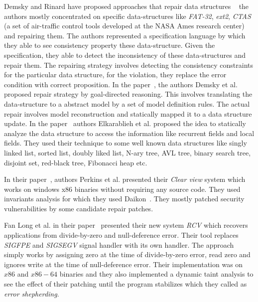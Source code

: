 {
Demsky and Rinard have proposed approaches that repair data structures ~\cite{
Demsky03automaticdata, conf/issre/DemskyR03,conf/oopsla/DemskyR03,
conf/issta/DemskyEGMPR06} the authors mostly concentrated on specific
data-structures like \emph{FAT-32}, \emph{ext2}, \emph{CTAS} (a set of
air-traffic control tools developed at the NASA Ames research center) and
repairing them. The authors represented a specification language by which they
able to see consistency property these data-structure.
Given the specification, they able to detect the inconsistency of these
data-structures and repair them.
The repairing strategy involves detecting the consistency constraints for the
particular data structure, for the violation, they replace the error condition
with correct proposition. In the paper~\cite{conf/icse/DemskyR05}, the authors
Demsky et al. proposed repair strategy by goal-directed reasoning. This involves
translating the data-structure to a abstract model by a set of model definition
rules. The actual repair involves model reconstruction and statically mapped it
to a data structure update. In the paper~\cite{conf/oopsla/2007} authors
Elkarablieh et al. proposed the idea to statically analyze the data structure to
access the information like recurrent fields and local fields. They used their
technique to some well known data structures like singly linked list, sorted
list, doubly liked list, N-ary tree, AVL tree, binary search tree, disjoint set,
red-black tree, Fibonacci heap etc.

In their paper~\cite{conf/sosp/PerkinsKLABCPSSSWZER09}, authors Perkins et al.
presented their \emph{Clear view} system which works on windows x86 binaries
without requiring any source code. They used invariants analysis for which they
used Daikon~\cite{DBLP:journals/scp/ErnstPGMPTX07}. They mostly patched security
vulnerabilities by some candidate repair patches.

Fan Long et al. in their paper~\cite{conf/pldi/LongSR14} presented their new
system \emph{RCV} which recovers applications from divide-by-zero and
null-deference error. Their tool replaces \emph{SIGFPE} and \emph{SIGSEGV}
signal handler with its own handler. The approach simply works by assigning zero
at the time of divide-by-zero error, read zero and ignores write at the time of
null-deference error. Their implementation was on $x86$ and $x86-64$ binaries
and they also implemented a dynamic taint analysis to see the effect of their
patching until the program stabilizes which they called as \emph{error
shepherding}.

}
